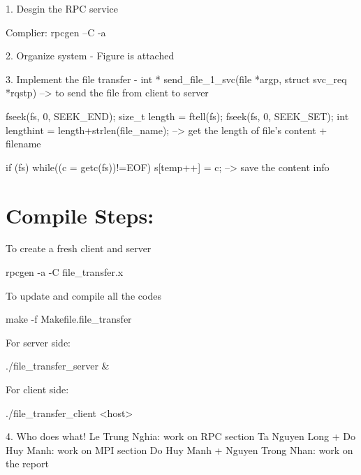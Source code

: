 \documentclass{article}
\title{Report #2: RPC}
\author{Le Trung Nghia - USTHBI5-098 ** Ta Nguyen Long - USTHBI5-080 ** Do Huy Manh - USTHBI6-093 ** Nguyen Trong Nhan - USTHBI4-115 }
\date{January 2018}
\begin{document}
1. Desgin the RPC service

Complier: rpcgen –C -a

2. Organize system
 - Figure is attached
 
3. Implement the file transfer
- int *
send_file_1_svc(file *argp, struct svc_req *rqstp)
--> to send the file from client to server

fseek(fs, 0, SEEK_END);    
	size_t length = ftell(fs); 
	fseek(fs, 0, SEEK_SET);
	int lengthint = length+strlen(file_name);
--> get the length of file's content + filename

if (fs){
	while((c = getc(fs))!=EOF)
	s[temp++] = c;
	}
--> save the content info

 \section{Compile Steps:}

To create a fresh client and server

rpcgen -a -C file_transfer.x

To update and compile all the codes

make -f Makefile.file_transfer

For server side:

./file_transfer_server &

For client side:

./file_transfer_client <host>


4. Who does what!
Le Trung Nghia: work on RPC section
Ta Nguyen Long + Do Huy Manh: work on MPI section
Do Huy Manh + Nguyen Trong Nhan: work on the report
\end{document}
